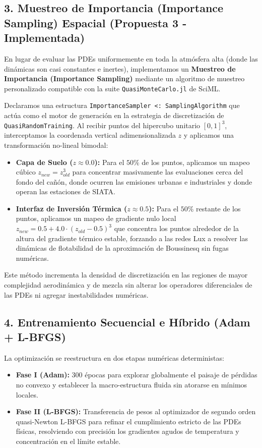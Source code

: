 \documentclass[11pt,a4paper]{article}
\begin{document}
\subsection{3. Muestreo de Importancia (Importance Sampling) Espacial (Propuesta 3 - Implementada)}
En lugar de evaluar las PDEs uniformemente en toda la atmósfera alta (donde las dinámicas son casi constantes e inertes), implementamos un \textbf{Muestreo de Importancia (Importance Sampling)} mediante un algoritmo de muestreo personalizado compatible con la suite \texttt{QuasiMonteCarlo.jl} de SciML.

Declaramos una estructura \texttt{ImportanceSampler <: SamplingAlgorithm} que actúa como el motor de generación en la estrategia de discretización de \texttt{QuasiRandomTraining}. Al recibir puntos del hipercubo unitario $[0, 1]^3$, interceptamos la coordenada vertical adimensionalizada $z$ y aplicamos una transformación no-lineal bimodal:
\begin{itemize}
    \item \textbf{Capa de Suelo ($z \approx 0.0$):} Para el $50\%$ de los puntos, aplicamos un mapeo cúbico $z_{new} = z_{old}^3$ para concentrar masivamente las evaluaciones cerca del fondo del cañón, donde ocurren las emisiones urbanas e industriales y donde operan las estaciones de SIATA.
    \item \textbf{Interfaz de Inversión Térmica ($z \approx 0.5$):} Para el $50\%$ restante de los puntos, aplicamos un mapeo de gradiente nulo local $z_{new} = 0.5 + 4.0 \cdot (z_{old} - 0.5)^3$ que concentra los puntos alrededor de la altura del gradiente térmico estable, forzando a las redes Lux a resolver las dinámicas de flotabilidad de la aproximación de Boussinesq sin fugas numéricas.
\end{itemize}
Este método incrementa la densidad de discretización en las regiones de mayor complejidad aerodinámica y de mezcla sin alterar los operadores diferenciales de las PDEs ni agregar inestabilidades numéricas.

\subsection{4. Entrenamiento Secuencial e Híbrido (Adam + L-BFGS)}
La optimización se reestructura en dos etapas numéricas deterministas:
\begin{itemize}
    \item \textbf{Fase I (Adam):} 300 épocas para explorar globalmente el paisaje de pérdidas no convexo y establecer la macro-estructura fluida sin atorarse en mínimos locales.
    \item \textbf{Fase II (L-BFGS):} Transferencia de pesos al optimizador de segundo orden quasi-Newton L-BFGS para refinar el cumplimiento estricto de las PDEs físicas, resolviendo con precisión los gradientes agudos de temperatura y concentración en el límite estable.
\end{itemize}
\end{document}

